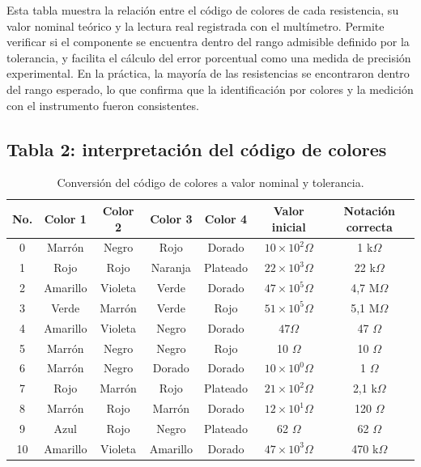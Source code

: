 Esta tabla muestra la relación entre el código de colores de cada resistencia, su valor nominal teórico y la lectura real registrada con el multímetro. Permite verificar si el componente se encuentra dentro del rango admisible definido por la tolerancia, y facilita el cálculo del error porcentual como una medida de precisión experimental. En la práctica, la mayoría de las resistencias se encontraron dentro del rango esperado, lo que confirma que la identificación por colores y la medición con el instrumento fueron consistentes.

\subsection{Tabla 2: interpretación del código de colores}

\begin{table}[H]
\centering
\caption{Conversión del código de colores a valor nominal y tolerancia.}
\renewcommand{\arraystretch}{1.2}
\begin{tabular}{|c|c|c|c|c|c|c|}
\hline
No. & Color 1 & Color 2 & Color 3 & Color 4 & Valor inicial & Notación correcta \\
\hline
0 & Marrón & Negro & Rojo & Dorado & $10\times10^{2}\Omega$ & 1 k$\Omega$ \\
1 & Rojo & Rojo & Naranja & Plateado & $22\times10^{3}\Omega$ & 22 k$\Omega$ \\
2 & Amarillo & Violeta & Verde & Dorado & $47\times10^{5}\Omega$ & 4,7 M$\Omega$ \\
3 & Verde & Marrón & Verde & Rojo & $51\times10^{5}\Omega$ & 5,1 M$\Omega$ \\
4 & Amarillo & Violeta & Negro & Dorado & $47\Omega$ & 47 $\Omega$ \\
5 & Marrón & Negro & Negro & Rojo & 10 $\Omega$ & 10 $\Omega$ \\
6 & Marrón & Negro & Dorado & Dorado & $10\times10^{0}\Omega$ & 1 $\Omega$ \\
7 & Rojo & Marrón & Rojo & Plateado & $21\times10^{2}\Omega$ & 2,1 k$\Omega$ \\
8 & Marrón & Rojo & Marrón & Dorado & $12\times10^{1}\Omega$ & 120 $\Omega$ \\
9 & Azul & Rojo & Negro & Plateado & 62 $\Omega$ & 62 $\Omega$ \\
10 & Amarillo & Violeta & Amarillo & Dorado & $47\times10^{3}\Omega$ & 470 k$\Omega$ \\
\hline
\end{tabular}
\end{table}

